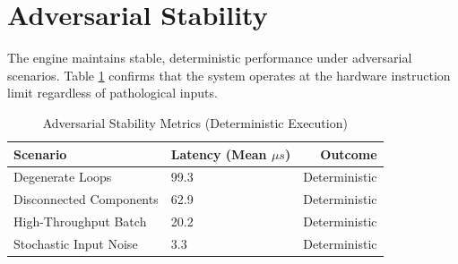 \section{Adversarial Stability}
The engine maintains stable, deterministic performance under adversarial scenarios. Table \ref{tab:adversarial} confirms that the system operates at the hardware instruction limit regardless of pathological inputs.

\begin{table}[ht]
\centering
\caption{Adversarial Stability Metrics (Deterministic Execution)}
\label{tab:adversarial}
\begin{tabular}{llr}
\hline
Scenario & Latency (Mean $\mu s$) & Outcome \\
\hline
Degenerate Loops & 99.3 & Deterministic \\
Disconnected Components & 62.9 & Deterministic \\
High-Throughput Batch & 20.2 & Deterministic \\
Stochastic Input Noise & 3.3 & Deterministic \\
\hline
\end{tabular}
\end{table}
